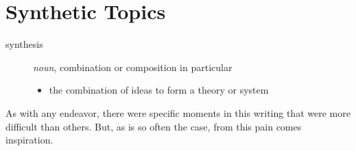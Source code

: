 \documentclass[../butidigress.tex]{subfiles}
\begin{document}
\chapter{Synthetic Topics}\label{chap:synthetic}
\newpage

\begin{description}
    \item [synthesis] \textit{noun}, combination or composition in particular
    \begin{itemize}
        \item the combination of ideas to form a theory or system
    \end{itemize}
\end{description}

As with any endeavor, there were specific moments in this writing that were more difficult than others.
But, as is so often the case, from this pain comes inspiration.
\end{document}
